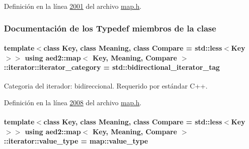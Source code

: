 Definición en la línea \hyperlink{map_8h_source_l02001}{2001} del archivo \hyperlink{map_8h_source}{map.\+h}.



\subsubsection{Documentación de los \textquotesingle{}Typedef\textquotesingle{} miembros de la clase}
\paragraph[{\texorpdfstring{iterator\+\_\+category}{iterator_category}}]{\setlength{\rightskip}{0pt plus 5cm}template$<$class Key, class Meaning, class Compare = std\+::less$<$\+Key$>$$>$ using {\bf aed2\+::map}$<$ Key, Meaning, Compare $>$\+::{\bf iterator\+::iterator\+\_\+category} =  std\+::bidirectional\+\_\+iterator\+\_\+tag}\hypertarget{classaed2_1_1map_1_1iterator_a709df3d8aef6fd1eeb839616b554ff0b_a709df3d8aef6fd1eeb839616b554ff0b}{}\label{classaed2_1_1map_1_1iterator_a709df3d8aef6fd1eeb839616b554ff0b_a709df3d8aef6fd1eeb839616b554ff0b}


Categoria del iterador\+: bidireccional. Requerido por estándar C++. 



Definición en la línea \hyperlink{map_8h_source_l02008}{2008} del archivo \hyperlink{map_8h_source}{map.\+h}.

\paragraph[{\texorpdfstring{value\+\_\+type}{value_type}}]{\setlength{\rightskip}{0pt plus 5cm}template$<$class Key, class Meaning, class Compare = std\+::less$<$\+Key$>$$>$ using {\bf aed2\+::map}$<$ Key, Meaning, Compare $>$\+::{\bf iterator\+::value\+\_\+type} =  {\bf map\+::value\+\_\+type}}\hypertarget{classaed2_1_1map_1_1iterator_a4e1d954ef5c6a64bbcd881854f039a16_a4e1d954ef5c6a64bbcd881854f039a16}{}\label{classaed2_1_1map_1_1iterator_a4e1d954ef5c6a64bbcd881854f039a16_a4e1d954ef5c6a64bbcd881854f039a16}


